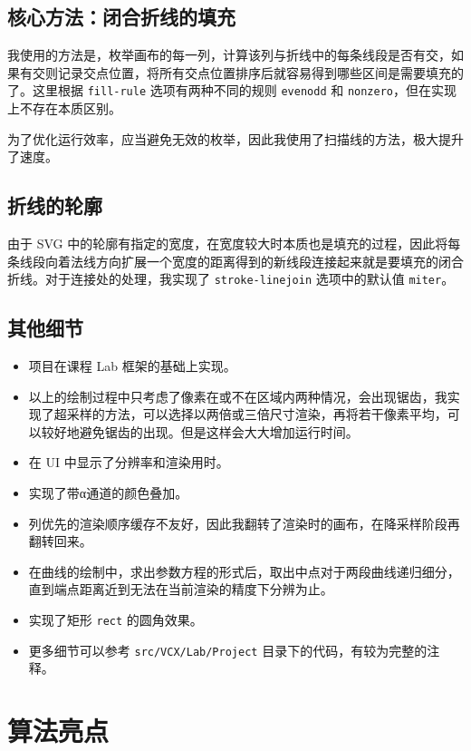 \documentclass[UTF8]{ctexart}
\begin{document}
\subsection{核心方法：闭合折线的填充}

我使用的方法是，枚举画布的每一列，计算该列与折线中的每条线段是否有交，如果有交则记录交点位置，将所有交点位置排序后就容易得到哪些区间是需要填充的了。这里根据 \texttt{fill-rule} 选项有两种不同的规则 \texttt{evenodd} 和 \texttt{nonzero}，但在实现上不存在本质区别。

为了优化运行效率，应当避免无效的枚举，因此我使用了扫描线的方法，极大提升了速度。

\subsection{折线的轮廓}

由于 SVG 中的轮廓有指定的宽度，在宽度较大时本质也是填充的过程，因此将每条线段向着法线方向扩展一个宽度的距离得到的新线段连接起来就是要填充的闭合折线。对于连接处的处理，我实现了 \texttt{stroke-linejoin} 选项中的默认值 \texttt{miter}。

\subsection{其他细节}

\begin{itemize}
    \item 项目在课程 Lab 框架的基础上实现。
    \item 以上的绘制过程中只考虑了像素在或不在区域内两种情况，会出现锯齿，我实现了超采样的方法，可以选择以两倍或三倍尺寸渲染，再将若干像素平均，可以较好地避免锯齿的出现。但是这样会大大增加运行时间。
    \item 在 UI 中显示了分辨率和渲染用时。
    \item 实现了带α通道的颜色叠加。
    \item 列优先的渲染顺序缓存不友好，因此我翻转了渲染时的画布，在降采样阶段再翻转回来。
    \item 在曲线的绘制中，求出参数方程的形式后，取出中点对于两段曲线递归细分，直到端点距离近到无法在当前渲染的精度下分辨为止。
    \item 实现了矩形 \texttt{rect} 的圆角效果。
    \item 更多细节可以参考 \texttt{src/VCX/Lab/Project} 目录下的代码，有较为完整的注释。
\end{itemize}

\section{算法亮点}
\end{document}
